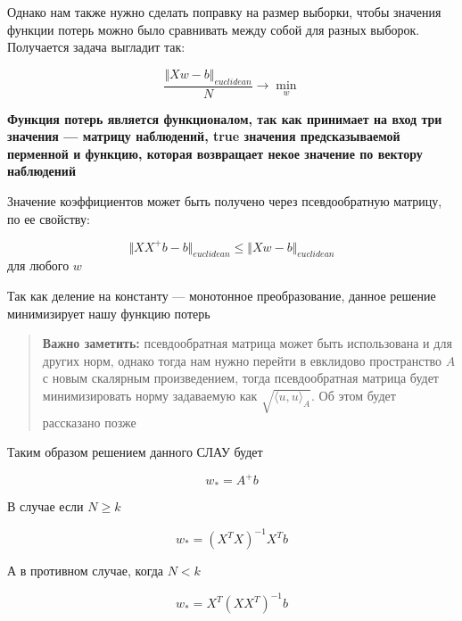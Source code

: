 \documentclass{article}
\begin{document}
    Однако нам также нужно сделать поправку на размер выборки, чтобы значения функции потерь можно было сравнивать между собой для разных выборок.
    Получается задача выгладит так:

     \begin{equation}
        \frac{\Vert Xw - b \Vert_{euclidean}}{N} \rightarrow \min_{w}
     \end{equation}
    
    \textbf{Функция потерь является функционалом, так как принимает на вход три значения --- матрицу наблюдений, true значения предсказываемой перменной и функцию, которая возвращает некое значение по вектору наблюдений}

    Значение коэффициентов может быть получено через псевдообратную матрицу, по ее свойству:

    \begin{equation}
        \Vert X X^{+} b - b \Vert_{euclidean} \leq \Vert X w - b \Vert_{euclidean}
    \end{equation}
    для любого $w$

    \quad

    Так как деление на константу --- монотонное преобразование, данное решение минимизирует нашу функцию потерь

    \begin{quote}
        \textbf{Важно заметить:} псевдообратная матрица может быть использована и для других норм, однако тогда нам
        нужно перейти в евклидово пространство $A$ с новым скалярным произведением, тогда псевдообратная матрица будет минимизировать
        норму задаваемую как $\sqrt{\langle u, u \rangle_{A}}$.
        Об этом будет рассказано позже
    \end{quote}

    Таким образом решением данного СЛАУ будет

    \begin{equation}
        w_{*} = A^{+}b
    \end{equation}

    В случае если $N \geq k$
    
    \begin{equation}
        w_{*} = (X^{T} X)^{-1} X^{T} b
    \end{equation}

    А в противном случае, когда $N < k$

    \begin{equation}
        w_{*} = X^{T} (X X^{T})^{-1} b
    \end{equation}
\end{document}
